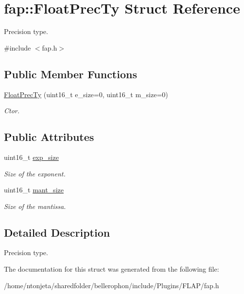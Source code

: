 \hypertarget{structfap_1_1FloatPrecTy}{}\section{fap\+:\+:Float\+Prec\+Ty Struct Reference}
\label{structfap_1_1FloatPrecTy}


Precision type.  




{\ttfamily \#include $<$fap.\+h$>$}

\subsection*{Public Member Functions}
\begin{DoxyCompactItemize}
\item 
\hypertarget{structfap_1_1FloatPrecTy_a1c56ab968789c9865e6df95016bad2ce}{}\label{structfap_1_1FloatPrecTy_a1c56ab968789c9865e6df95016bad2ce} 
\hyperlink{structfap_1_1FloatPrecTy_a1c56ab968789c9865e6df95016bad2ce}{Float\+Prec\+Ty} (uint16\+\_\+t e\+\_\+size=0, uint16\+\_\+t m\+\_\+size=0)
\begin{DoxyCompactList}\small\item\em Ctor. \end{DoxyCompactList}\end{DoxyCompactItemize}
\subsection*{Public Attributes}
\begin{DoxyCompactItemize}
\item 
\hypertarget{structfap_1_1FloatPrecTy_aa735c1c26af6de0c7649c9f9eeada8d7}{}\label{structfap_1_1FloatPrecTy_aa735c1c26af6de0c7649c9f9eeada8d7} 
uint16\+\_\+t \hyperlink{structfap_1_1FloatPrecTy_aa735c1c26af6de0c7649c9f9eeada8d7}{exp\+\_\+size}
\begin{DoxyCompactList}\small\item\em Size of the exponent. \end{DoxyCompactList}\item 
\hypertarget{structfap_1_1FloatPrecTy_a5cffda7c85e7e3dd7f4e1645e2c7dda5}{}\label{structfap_1_1FloatPrecTy_a5cffda7c85e7e3dd7f4e1645e2c7dda5} 
uint16\+\_\+t \hyperlink{structfap_1_1FloatPrecTy_a5cffda7c85e7e3dd7f4e1645e2c7dda5}{mant\+\_\+size}
\begin{DoxyCompactList}\small\item\em Size of the mantissa. \end{DoxyCompactList}\end{DoxyCompactItemize}


\subsection{Detailed Description}
Precision type. 

The documentation for this struct was generated from the following file\+:\begin{DoxyCompactItemize}
\item 
/home/ntonjeta/sharedfolder/bellerophon/include/\+Plugins/\+F\+L\+A\+P/fap.\+h\end{DoxyCompactItemize}
